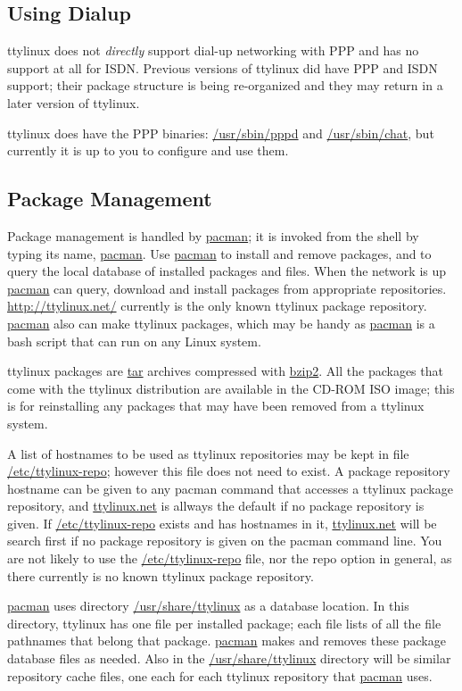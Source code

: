 \documentclass[10pt]{article}
\begin{document}
\subsection{Using Dialup}

ttylinux does not {\it directly} support dial-up networking with PPP and has no
support at all for ISDN. Previous versions of ttylinux did have PPP and ISDN
support; their package structure is being re-organized and they may return
in a later version of ttylinux.

ttylinux does have the PPP binaries: \url{/usr/sbin/pppd} and
\url{/usr/sbin/chat}, but currently it is up to you to configure and use them.

\subsection{Package Management}
\label{pacmanger}

Package management is handled by \url{pacman}; it is invoked from the shell
by typing its name, \url{pacman}. Use \url{pacman} to install and remove
packages, and to query the local database of installed packages and files. When
the network is up \url{pacman} can query, download and install packages from
appropriate repositories. \url{http://ttylinux.net/} currently is the only
known ttylinux package repository. \url{pacman} also can make ttylinux
packages, which may be handy as \url{pacman} is a bash script that can run on
any Linux system.

ttylinux packages are \url{tar} archives compressed with \url{bzip2}. All the
packages that come with the ttylinux distribution are available in the CD-ROM
ISO image; this is for reinstalling any packages that may have been removed
from a ttylinux system.

A list of hostnames to be used as ttylinux repositories may be kept in file
\url{/etc/ttylinux-repo}; however this file does not need to exist. A package
repository hostname can be given to any pacman command that accesses a ttylinux
package repository, and \url{ttylinux.net} is allways the default if no package
repository is given. If \url{/etc/ttylinux-repo} exists and has hostnames in
it, \url{ttylinux.net} will be search first if no package repository is given
on the pacman command line. You are not likely to use the
\url{/etc/ttylinux-repo} file, nor the repo option in general, as there
currently is no known ttylinux package repository.

\url{pacman} uses directory \url{/usr/share/ttylinux} as a database location.
In this directory, ttylinux has one file per installed package; each file
lists of all the file pathnames that belong that package. \url{pacman} makes
and removes these package database files as needed. Also in the
\url{/usr/share/ttylinux} directory will be similar repository cache files, one
each for each ttylinux repository that \url{pacman} uses.
\end{document}
